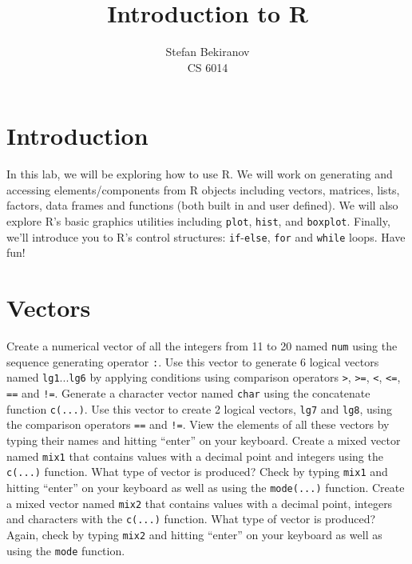 \documentclass[12pt]{article}
\newcommand{\code}[1]{{\texttt{#1}}}
\begin{document}

\title{Introduction to R}

\author{Stefan Bekiranov\\CS 6014}
\maketitle

\tableofcontents

\section{Introduction}

In this lab, we will be exploring how to use R.  We will work on generating and accessing elements/components from R objects including vectors, matrices, lists, factors, data frames and functions (both built in and user defined).  We will also explore R's basic graphics utilities including \code{plot}, \code{hist}, and \code{boxplot}.  Finally, we'll introduce you to R's control structures: \code{if}-\code{else}, \code{for} and \code{while} loops.  Have fun!
  
\section{Vectors}

Create a numerical vector of all the integers from 11 to 20 named \code{num} using the sequence generating operator \code{:}.  Use this vector to generate 6 logical vectors named \code{lg1}...\code{lg6} by applying conditions using comparison operators \code{>}, \code{>=}, \code{<}, \code{<=}, \code{==} and \code{!=}.  Generate a character vector named \code{char} using the concatenate function \code{c(...)}.  Use this vector to create 2 logical vectors, \code{lg7} and \code{lg8}, using the comparison operators \code{==} and \code{!=}.  View the elements of all these vectors by typing their names and hitting ``enter'' on your keyboard.  Create a mixed vector named \code{mix1} that contains values with a decimal point and integers using the \code{c(...)} function.  What type of vector is produced?  Check by typing \code{mix1} and hitting ``enter'' on your keyboard as well as using the \code{mode(...)} function.  Create a mixed vector named \code{mix2} that contains values with a decimal point, integers and characters with the \code{c(...)} function.  What type of vector is produced?  Again, check by typing \code{mix2} and hitting ``enter'' on your keyboard as well as using the \code{mode} function.    
\end{document}
